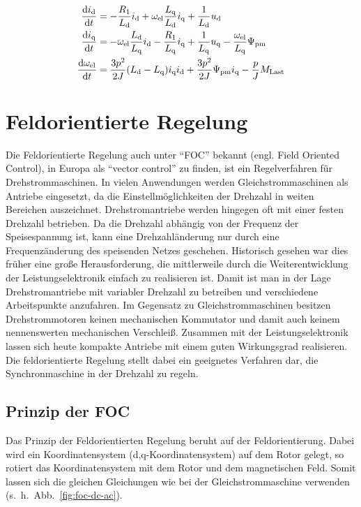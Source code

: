 \begin{align}
\frac{\mathrm{d}i_{\mathrm{d}}}{\mathrm{d}t} &= -\frac{R_{\mathrm{1}}}{L_{\mathrm{d}}}i_{\mathrm{d}}+\omega_{\mathrm{el}}\frac{L_{\mathrm{q}}}{L_{\mathrm{d}}}i_{\mathrm{q}}+\frac{1}{L_{\mathrm{d}}}u_{\mathrm{d}} \label{eqn:id_dt} \\
\frac{\mathrm{d}i_{\mathrm{q}}}{\mathrm{d}t} &= -\omega_{\mathrm{el}}\frac{L_{\mathrm{d}}}{L_{\mathrm{q}}}i_{\mathrm{d}} - \frac{R_{\mathrm{1}}}{L_{\mathrm{q}}}i_{\mathrm{q}} + \frac{1}{L_{\mathrm{q}}}u_{\mathrm{q}} - \frac{\omega_{\mathrm{el}}}{L_{\mathrm{q}}}\Psi_{\mathrm{pm}} \label{eqn:iq_dt} \\
\frac{\mathrm{d}\omega_{\mathrm{el}}}{\mathrm{d}t} &= \frac{3p^2}{2J}(L_{\mathrm{d}} - L_{\mathrm{q}})i_{\mathrm{q}} i_{\mathrm{d}} + \frac{3p^2}{2J} \Psi_{\mathrm{pm}} i_{\mathrm{q}} - \frac{p}{J} M_{\mathrm{Last}} \label{eqn:w_dt}
\end{align}

\section{Feldorientierte Regelung}\label{sec:foc}

Die Feldorientierte Regelung auch unter \enquote{FOC} bekannt (engl. Field Oriented Control), in Europa als \enquote{vector control} zu finden, ist ein Regelverfahren für Drehstrommaschinen.
In vielen Anwendungen werden Gleichstrommaschinen als Antriebe eingesetzt, da die Einstellmöglichkeiten der Drehzahl in weiten Bereichen auszeichnet.
Drehstromantriebe werden hingegen oft mit einer festen Drehzahl betrieben.
Da die Drehzahl abhängig von der Frequenz der Speisespannung ist, kann eine Drehzahländerung nur durch eine Frequenzänderung des speisenden Netzes geschehen.
Historisch gesehen war dies früher eine große Herausforderung, die mittlerweile durch die Weiterentwicklung der Leistungselektronik einfach zu realisieren ist.
Damit ist man in der Lage Drehstromantriebe mit variabler Drehzahl zu betreiben und verschiedene Arbeitspunkte anzufahren.
Im Gegensatz zu Gleichstrommaschinen besitzen Drehstrommotoren keinen mechanischen Kommutator und damit auch keinem nennenswerten mechanischen Verschleiß.
Zusammen mit der Leistungselektronik lassen sich heute kompakte Antriebe mit einem guten Wirkungsgrad realisieren.
Die feldorientierte Regelung stellt dabei ein geeignetes Verfahren dar, die Synchronmaschine in der Drehzahl zu regeln.

\subsection{Prinzip der FOC}

Das Prinzip der Feldorientierten Regelung beruht auf der Feldorientierung.
Dabei wird ein Koordinatensystem (d,q-Koordinatensystem) auf dem Rotor gelegt, so rotiert das Koordinatensystem mit dem Rotor und dem magnetischen Feld.
Somit lassen sich die gleichen Gleichungen wie bei der Gleichstrommaschine verwenden (s.~h.~Abb.~\ref{fig:foc-dc-ac}).


